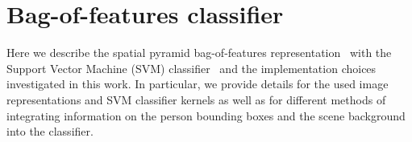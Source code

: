 \documentclass{bmvc2k}
\newcommand{\red}[1]{{\em \small \color{red} #1}} %
\newcommand{\secnspc}{\vspace*{-3mm}}       %
\newcommand{\parnspc}{\vspace*{-4.2mm}}     %
\begin{document}



\secnspc
\section{Bag-of-features classifier}
\secnspc
\label{sec:bof}

Here we describe the spatial pyramid bag-of-features representation~\cite{Lazebnik06} 
with the Support Vector Machine (SVM) classifier~\cite{Scholkopf} and the implementation choices investigated in this work.  In particular, we provide details for the used image representations and SVM classifier kernels as well as for
different methods of integrating information on the person bounding boxes and the scene background into the classifier. 



\parnspc
\end{document}
